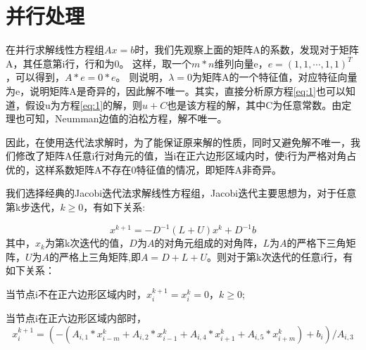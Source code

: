 \documentclass[a4paper,11pt]{ctexart} %
\begin{document}
\section{并行处理}
在并行求解线性方程组$Ax=b$时，我们先观察上面的矩阵A的系数，发现对于矩阵A，其任意第i行，行和为0。
这样，取一个$m*n$维列向量e，$e=(1,1,\cdots,1,1)^T$，可以得到，$A*e=0*e$。
则说明，$\lambda=0$为矩阵A的一个特征值，对应特征向量为e，说明矩阵A是奇异的，因此解不唯一。其实，直接分析原方程\eqref{eq:1}也可以知道，假设u为方程\eqref{eq:1}的解，则$u+C$也是该方程的解，其中C为任意常数。由定理也可知，Neumman边值的泊松方程，解不唯一。\par
因此，在使用迭代法求解时，为了能保证原来解的性质，同时又避免解不唯一，我们修改了矩阵A任意i行对角元的值，当i在正六边形区域内时，使i行为严格对角占优的，这样系数矩阵A不存在0特征值的情况，即矩阵A非奇异。\par
我们选择经典的Jacobi迭代法求解线性方程组，Jacobi迭代主要思想为，对于任意第k步迭代，$k\geq 0$，有如下关系:\par
$$x^{k+1}=-D^{-1}(L+U)x^k+D^{-1}b$$
其中，$x_k$为第k次迭代的值，$D$为$A$的对角元组成的对角阵，$L$为$A$的严格下三角矩阵，$U$为$A$的严格上三角矩阵,即$A=D+L+U$。则对于第k次迭代的任意i行，有如下关系：\par
当节点i不在正六边形区域内时，$x^{k+1}_i=x^k_i=0$，$k\geq 0$;\par
当节点i在正六边形区域内部时，
$$x^{k+1}_i=(-(A_{i,1}*x^k_{i-m}+A_{i,2}*x^k_{i-1}+A_{i,4}*x^k_{i+1}+A_{i,5}*x^k_{i+m})+b_i)/A_{i,3}$$
\end{document}

